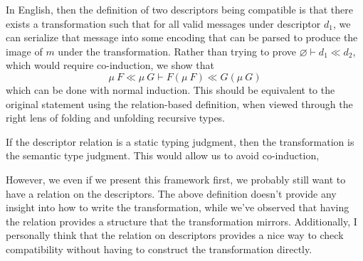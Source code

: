 In English, then the definition of two descriptors being compatible is that
there exists a transformation such that for all valid messages under descriptor
$d_1$, we can serialize that message into some encoding that can be parsed to
produce the image of $m$ under the transformation. Rather than trying to prove
$\varnothing \vdash d_1 \ll d_2$, which would require co-induction, we show that 
\[ \mu\ F \ll \mu\ G \vdash F (\mu\ F) \ll G (\mu\ G) \]
which can be done with normal induction. This should be equivalent to the
original statement using the relation-based definition, when viewed through the
right lens of folding and unfolding recursive types.

If the descriptor relation is a static typing judgment, then the transformation
is the semantic type judgment. This would allow us to avoid co-induction, 

However, we even if we present this framework first, we probably still want to
have a relation on the descriptors. The above definition doesn't provide any
insight into how to write the transformation, while we've observed that having
the relation provides a structure that the transformation mirrors. Additionally,
I personally think that the relation on descriptors provides a nice way to check
compatibility without having to construct the transformation directly.

